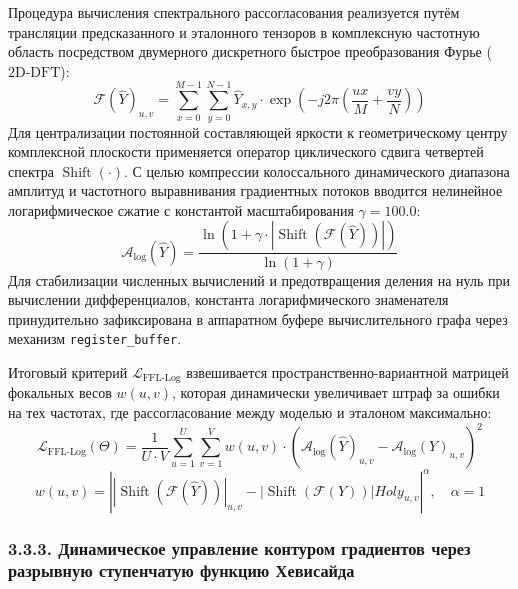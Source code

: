 \documentclass[12pt,a4paper]{article}
\begin{document}
Процедура вычисления спектрального рассогласования реализуется путём трансляции предсказанного и эталонного тензоров в комплексную частотную область посредством двумерного дискретного быстрое преобразования Фурье ($\text{2D-DFT}$):
\begin{equation}
\mathcal{F}(\hat{Y})_{u,v} = \sum_{x=0}^{M-1} \sum_{y=0}^{N-1} \hat{Y}_{x,y} \cdot \exp\left( -j 2\pi \left( \frac{ux}{M} + \frac{vy}{N} \right) \right)
\end{equation}
Для централизации постоянной составляющей яркости к геометрическому центру комплексной плоскости применяется оператор циклического сдвига четвертей спектра $\operatorname{Shift}(\cdot)$. С целью компрессии колоссального динамического диапазона амплитуд и частотного выравнивания градиентных потоков вводится нелинейное логарифмическое сжатие с константой масштабирования $\gamma = 100.0$:
\begin{equation}
\mathcal{A}_{\log}(\hat{Y}) = \frac{\ln\left(1 + \gamma \cdot \left|\operatorname{Shift}\left(\mathcal{F}(\hat{Y})\right)\right|\right)}{\ln(1 + \gamma)}
\end{equation}
Для стабилизации численных вычислений и предотвращения деления на нуль при вычислении дифференциалов, константа логарифмического знаменателя принудительно зафиксирована в аппаратном буфере вычислительного графа через механизм \texttt{register\_buffer}.

Итоговый критерий $\mathcal{L}_{\operatorname{FFL-Log}}$ взвешивается пространственно-вариантной матрицей фокальных весов $w(u,v)$, которая динамически увеличивает штраф за ошибки на тех частотах, где рассогласование между моделью и эталоном максимально:
\begin{equation}
\mathcal{L}_{\operatorname{FFL-Log}}(\Theta) = \frac{1}{U \cdot V} \sum_{u=1}^{U} \sum_{v=1}^{V} w(u,v) \cdot \left( \mathcal{A}_{\log}(\hat{Y})_{u,v} - \mathcal{A}_{\log}(Y)_{u,v} \right)^2
\end{equation}
\begin{equation}
w(u,v) = \left| \left|\operatorname{Shift}\left(\mathcal{F}(\hat{Y})\right)\right|_{u,v} - \left|\operatorname{Shift}\left(\mathcal{F}(Y)\right)\right| Holy_{u,v} \right|^\alpha, \quad \alpha = 1
\end{equation}

\subsubsection{3.3.3. Динамическое управление контуром градиентов через разрывную ступенчатую функцию Хевисайда}
\end{document}
